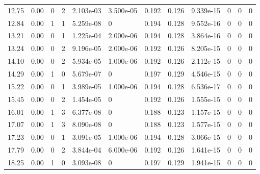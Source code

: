 \documentclass[preview]{standalone}
\begin{document}
{{\begin{tabular}{L{1.2cm}C{1.2cm} C{0.3cm}C{0.5cm} C{1.4cm}C{1.4cm} C{1.4cm}C{1.4cm} C{1.6cm}C{1.6cm} C{1.6cm}C{1.6cm}}
  12.75  &  0.00  & 0     &  2 &  2.103e-03  & 3.500e-05  &  0.192&   0.126& 9.339e-15 & 0   &  0 & 0  \\ 
  12.84  &  0.00  & 1     &  1 &  5.259e-08  & 0  &  0.194&   0.128& 9.552e-16 & 0   &  0 & 0  \\ 
  13.21  &  0.00  & 0     &  1 &  1.225e-04  & 2.000e-06  &  0.194&   0.128& 3.864e-16 & 0   &  0 & 0  \\ 
  13.24  &  0.00  & 0     &  2 &  9.196e-05  & 2.000e-06  &  0.192&   0.126& 8.205e-15 & 0   &  0 & 0  \\ 
  14.10  &  0.00  & 0     &  2 &  5.934e-05  & 1.000e-06  &  0.192&   0.126& 2.112e-15 & 0   &  0 & 0  \\ 
  14.29  &  0.00  & 1     &  0 &  5.679e-07  & 0  &  0.197&   0.129& 4.546e-15 & 0   &  0 & 0  \\ 
  15.22  &  0.00  & 0     &  1 &  3.989e-05  & 1.000e-06  &  0.194&   0.128& 6.536e-17 & 0   &  0 & 0  \\ 
  15.45  &  0.00  & 0     &  2 &  1.454e-05  & 0  &  0.192&   0.126& 1.555e-15 & 0   &  0 & 0  \\ 
  16.01  &  0.00  & 1     &  3 &  6.377e-08  & 0  &  0.188&   0.123& 1.157e-15 & 0   &  0 & 0  \\ 
  17.07  &  0.00  & 1     &  3 &  8.090e-08  & 0  &  0.188&   0.123& 1.577e-15 & 0   &  0 & 0  \\ 
  17.23  &  0.00  & 0     &  1 &  3.091e-05  & 1.000e-06  &  0.194&   0.128& 3.066e-15 & 0   &  0 & 0  \\ 
  17.79  &  0.00  & 0     &  2 &  3.844e-04  & 6.000e-06  &  0.192&   0.126& 1.641e-15 & 0   &  0 & 0  \\ 
  18.25  &  0.00  & 1     &  0 &  3.093e-08  & 0  &  0.197&   0.129& 1.941e-15 & 0   &  0 & 0  \\ 
\hline 
\end{tabular} 

}}
\end{document}

